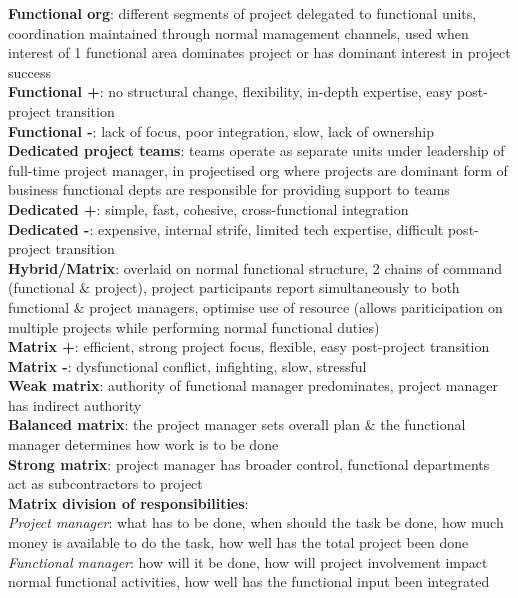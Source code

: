 \documentclass[a4paper]{article}
\begin{document}
\begin{multicols}{3}
        \textbf{Functional org}: different segments of project delegated to functional units, coordination maintained through normal management channels, used when interest of 1 functional area dominates project or has dominant interest in project success\\
        \textbf{Functional +}: no structural change, flexibility, in-depth expertise, easy post-project transition\\
        \textbf{Functional -}: lack of focus, poor integration, slow, lack of ownership\\
        \textbf{Dedicated project teams}: teams operate as separate units under leadership of full-time project manager, in projectised org where projects are dominant form of business functional depts are responsible for providing support to teams\\
        \textbf{Dedicated +}: simple, fast, cohesive, cross-functional integration\\
        \textbf{Dedicated -}: expensive, internal strife, limited tech expertise, difficult post-project transition\\
        \textbf{Hybrid/Matrix}: overlaid on normal functional structure, 2 chains of command (functional \& project), project participants report simultaneously to both functional \& project managers, optimise use of resource (allows pariticipation on multiple projects while performing normal functional duties)\\
        \textbf{Matrix +}: efficient, strong project focus, flexible, easy post-project transition\\
        \textbf{Matrix -}: dysfunctional conflict, infighting, slow, stressful\\
        \textbf{Weak matrix}: authority of functional manager predominates, project manager has indirect authority\\
        \textbf{Balanced matrix}: the project manager sets overall plan \& the functional manager determines how work is to be done\\
        \textbf{Strong matrix}: project manager has broader control, functional departments act as subcontractors to project\\
        \textbf{Matrix division of responsibilities}:\\
        \textit{Project manager}: what has to be done, when should the task be done, how much money is available to do the task, how well has the total project been done\\
        \textit{Functional manager}: how will it be done, how will project involvement impact normal functional activities, how well has the functional input been integrated\\

\end{multicols}
\end{document}
